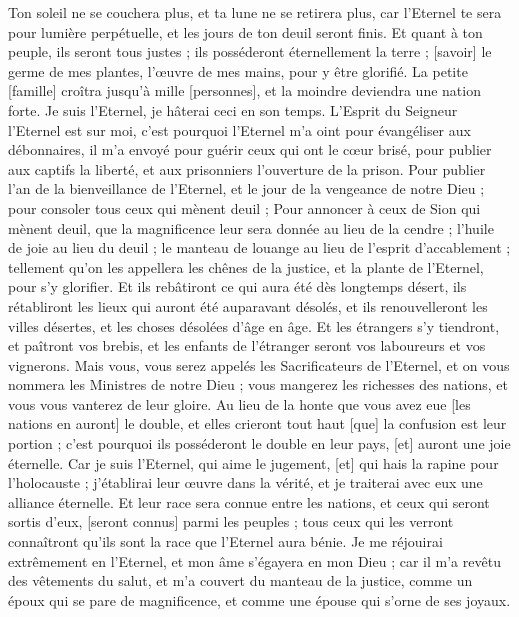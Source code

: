 \begin{multicols}{2}
Ton soleil ne se couchera plus, et ta lune ne se retirera plus, car l'Eternel te sera pour lumière perpétuelle, et les jours de ton deuil seront finis.
Et quant à ton peuple, ils seront tous justes ; ils posséderont éternellement la terre ; [savoir] le germe de mes plantes, l'œuvre de mes mains, pour y être glorifié.
La petite [famille] croîtra jusqu'à mille [personnes], et la moindre deviendra une nation forte. Je suis l'Eternel, je hâterai ceci en son temps.
\VerseOne{}L'Esprit du Seigneur l'Eternel est sur moi, c'est pourquoi l'Eternel m'a oint pour évangéliser aux débonnaires, il m'a envoyé pour guérir ceux qui ont le cœur brisé, pour publier aux captifs la liberté, et aux prisonniers l'ouverture de la prison.
Pour publier l'an de la bienveillance de l'Eternel, et le jour de la vengeance de notre Dieu ; pour consoler tous ceux qui mènent deuil ;
Pour annoncer à ceux de Sion qui mènent deuil, que la magnificence leur sera donnée au lieu de la cendre ; l'huile de joie au lieu du deuil ; le manteau de louange au lieu de l'esprit d'accablement ; tellement qu'on les appellera les chênes de la justice, et la plante de l'Eternel, pour s'y glorifier.
Et ils rebâtiront ce qui aura été dès longtemps désert, ils rétabliront les lieux qui auront été auparavant désolés, et ils renouvelleront les villes désertes, et les choses désolées d'âge en âge.
Et les étrangers s'y tiendront, et paîtront vos brebis, et les enfants de l'étranger seront vos laboureurs et vos vignerons.
Mais vous, vous serez appelés les Sacrificateurs de l'Eternel, et on vous nommera les Ministres de notre Dieu ; vous mangerez les richesses des nations, et vous vous vanterez de leur gloire.
Au lieu de la honte que vous avez eue [les nations en auront] le double, et elles crieront tout haut [que] la confusion est leur portion ; c'est pourquoi ils posséderont le double en leur pays, [et] auront une joie éternelle.
Car je suis l'Eternel, qui aime le jugement, [et] qui hais la rapine pour l'holocauste ; j'établirai leur œuvre dans la vérité, et je traiterai avec eux une alliance éternelle.
Et leur race sera connue entre les nations, et ceux qui seront sortis d'eux, [seront connus] parmi les peuples ; tous ceux qui les verront connaîtront qu'ils sont la race que l'Eternel aura bénie.
Je me réjouirai extrêmement en l'Eternel, et mon âme s'égayera en mon Dieu ; car il m'a revêtu des vêtements du salut, et m'a couvert du manteau de la justice, comme un époux qui se pare de magnificence, et comme une épouse qui s'orne de ses joyaux.

\end{multicols}

